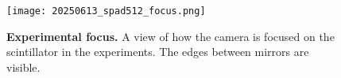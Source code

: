 \documentclass{article}
\begin{document}
\iffalse
\begin{figure}
\centering
\texttt{[image: setup\_pic.jpg]}
\caption{The experimental setup without the gamma-ray source.} 
\label{fig:setup}
\end{figure}
\fi

\begin{figure}
\centering
\texttt{[image: 20250613\_spad512\_focus.png]}
\caption{\textbf{Experimental focus.} A view of how the camera is focused on the scintillator in the experiments. The edges between mirrors are visible.} 
\label{fig:experiment_focus}
\end{figure}

%
%
\end{document}
